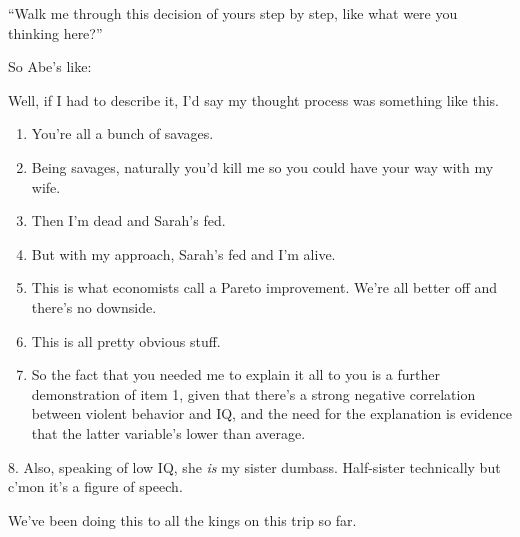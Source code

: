 {
}
{
}
{
	``Walk me through this decision of yours step by step, like what were you thinking here?''
}

{
}
{
}
{
	So Abe's like:

	Well, if I had to describe it, I'd say my thought process was something like this.

	\begin{enumerate}
	\item You're all a bunch of savages.
	\item Being savages, naturally you'd kill me so you could have your way with my wife.
	\item Then I'm dead and Sarah's fed.
	\item But with my approach, Sarah's fed and I'm alive.
	\item This is what economists call a Pareto improvement. We're all better off and there's no downside.
	\item This is all pretty obvious stuff.
	\item So the fact that you needed me to explain it all to you is a further demonstration of item 1, given that there's a strong negative correlation between violent behavior and IQ, and the need for the explanation is evidence that the latter variable's lower than average.
	\end{enumerate}
}

{
}
{
}
{
	8. Also, speaking of low IQ, she \emph{is} my sister dumbass. Half-sister technically but c'mon it's a figure of speech.
}

{
}
{
}
{
	We've been doing this to all the kings on this trip so far.

}

